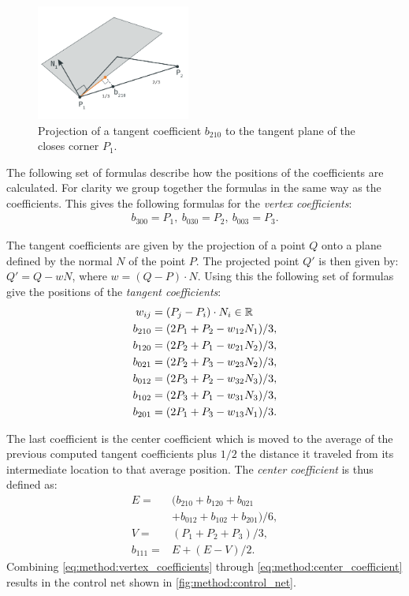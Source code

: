 \begin{figure}
	\centering
	\includegraphics[width=0.45\textwidth]{./content/img/method/geometry_tangent_projection.png}
	\caption{Projection of a tangent coefficient $b_{210}$ to the tangent plane of the closes corner $P_1$.}
	\label{fig:method:geometry_tangent_projection.png}
\end{figure}


The following set of formulas describe how the positions of the coefficients are calculated. For clarity we group together the formulas in the same way as the coefficients. This gives the following formulas for the \textit{vertex coefficients}:
\begin{align}\label{eq:method:vertex_coefficients}
	b_{300} = P_1,\ b_{030} = P_2,\ b_{003} = P_3.
\end{align}

The tangent coefficients are given by the projection of a point $Q$ onto a plane defined by the normal $N$ of the point $P$. The projected point $Q'$ is then given by: $Q' = Q - wN$, where $w = (Q - P) \cdot N$. Using this the following set of formulas give the positions of the \textit{tangent coefficients}:
\begin{align}\label{eq:method:tangent_coefficients}
	w_{ij} = {}& (P_j - P_i) \cdot N_i \in \mathbb{R} \nonumber\\
	b_{210} = {}& (2 P_1 + P_2 - w_{12}N_1) / 3,\nonumber\\
	b_{120} = {}& (2 P_2 + P_1 - w_{21}N_2) / 3,\nonumber\\
	b_{021} = {}& (2 P_2 + P_3 - w_{23}N_2) / 3, \\
	b_{012} = {}& (2 P_3 + P_2 - w_{32}N_3) / 3,\nonumber\\
	b_{102} = {}& (2 P_3 + P_1 - w_{31}N_3) / 3,\nonumber\\
	b_{201} = {}& (2 P_1 + P_3 - w_{13}N_1) / 3. \nonumber
\end{align}

The last coefficient is the center coefficient which is moved to the average of the previous computed tangent coefficients plus $1/2$ the distance it traveled from its intermediate location to that average position. The \textit{center coefficient} is thus defined as:
\begin{align}\label{eq:method:center_coefficient}
	E = {}& (b_{210} + b_{120} + b_{021} \nonumber \\
		{}& + b_{012} + b_{102} + b_{201}) / 6, \nonumber\\
	V = {}& (P_1 + P_2 + P_3) / 3, \\
	b_{111} = {}& E + (E - V) / 2. \nonumber
\end{align}
Combining \eqref{eq:method:vertex_coefficients} through \eqref{eq:method:center_coefficient} results in the control net shown in \cref{fig:method:control_net}.

